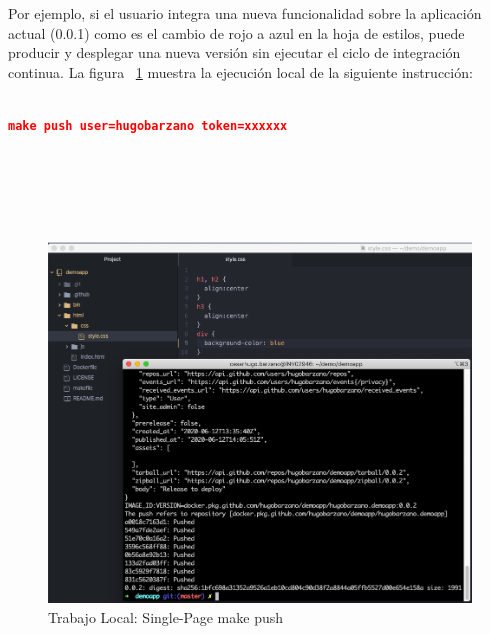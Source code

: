 \documentclass[a4paper,11pt]{book}
\begin{document}
Por ejemplo, si el usuario integra una nueva funcionalidad sobre la aplicación actual (0.0.1) como es el cambio de rojo a azul en la hoja de estilos, puede producir y desplegar una nueva versión sin ejecutar el ciclo de integración continua. La figura ~\ref{3_6} muestra la ejecución local de la siguiente  instrucción:
~\\
~\\

\begin{lstlisting}[language=json,firstnumber=1]
make push user=hugobarzano token=xxxxxx
\end{lstlisting}

~\\
~\\
~\\
~\\

\begin{figure}[H]
\centering
\includegraphics[scale=0.4]{imagenes/casouso_a/3_6.png}
\caption{ Trabajo Local: Single-Page make push  }
\label{3_6}
\end{figure}
\end{document}
